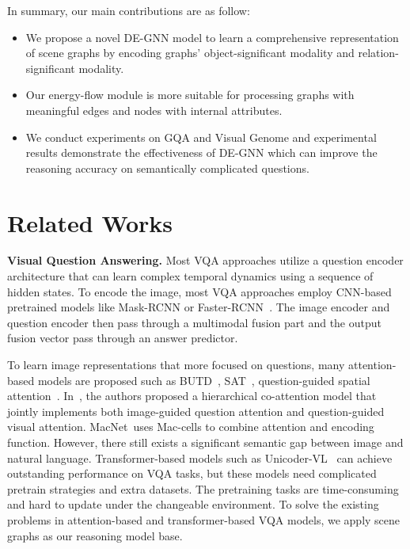 \documentclass[letterpaper]{article} %
\begin{document}
In summary, our main contributions are as follow:%
\begin{itemize}
\setlength{\itemsep}{5pt}
\setlength{\parsep}{5pt}
\setlength{\parskip}{5pt}
\item We propose a novel DE-GNN model to learn a comprehensive representation of scene graphs by encoding graphs' object-significant modality and relation-significant modality.\vspace{-0.06in}

\item Our energy-flow module is more suitable for processing graphs with meaningful edges and nodes with internal attributes.\vspace{-0.06in}

\item We conduct experiments on GQA and Visual Genome and experimental results demonstrate the effectiveness of DE-GNN which can improve the reasoning accuracy on semantically complicated questions.
\end{itemize}\vspace{-0.06in}

\section{Related Works}
\noindent\textbf{Visual Question Answering.}
Most VQA approaches utilize a question encoder architecture that can learn complex temporal dynamics using a sequence of hidden states. To encode the image, most VQA approaches employ CNN-based pretrained models like Mask-RCNN or Faster-RCNN~\cite{DBLP:conf/cvpr/FanZ18,DBLP:conf/cvpr/PatroN18,DBLP:conf/cvpr/NamHK17}. The image encoder and question encoder then pass through a multimodal fusion part and the output fusion vector pass through an answer predictor.

To learn image representations that more focused on questions, many attention-based models are proposed such as BUTD~\cite{DBLP:conf/cvpr/00010BT0GZ18}, SAT~\cite{DBLP:conf/cvpr/YangHGDS16}, question-guided spatial attention~\cite{DBLP:conf/eccv/XuS16}. In~\citet{DBLP:conf/nips/LuYBP16}, the authors proposed a hierarchical co-attention model that jointly implements both image-guided question attention and question-guided visual attention.  MacNet~\cite{DBLP:conf/iclr/HudsonM18}uses Mac-cells to combine attention and encoding function. However, there still exists a significant semantic gap between image and natural language. Transformer-based models such as Unicoder-VL~\cite{DBLP:conf/aaai/LiDFGJ20} can achieve outstanding performance on VQA tasks, but these models need complicated pretrain strategies and extra datasets. The pretraining tasks are time-consuming and hard to update under the changeable environment. To solve the existing problems in attention-based and transformer-based VQA models, we apply scene graphs as our reasoning model base.
\end{document}
